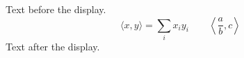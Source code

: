 \documentclass{article}
\begin{document}
Text before the display.
\[
  \langle x, y \rangle = \sum_i x_i y_i
  \qquad
  \left\langle \frac{a}{b}, c \right\rangle
\]
Text after the display.
\end{document}
